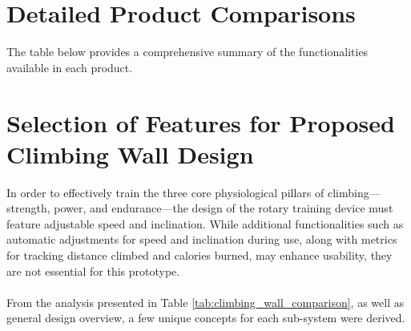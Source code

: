 \section{Detailed Product Comparisons}
The table below provides a comprehensive summary of the functionalities available in each product.

\begin{table}[H]
\centering
\caption{Comparison of Climbing Wall Models}
\label{tab:climbing_wall_comparison}
\end{table}

\section{Selection of Features for Proposed Climbing Wall Design}
In order to effectively train the three core physiological pillars of climbing—strength, power, and endurance—the design of the rotary training device must feature adjustable speed and inclination. While additional functionalities such as automatic adjustments for speed and inclination during use, along with metrics for tracking distance climbed and calories burned, may enhance usability, they are not essential for this prototype.\\\\
From the analysis presented in Table \ref{tab:climbing_wall_comparison}, as well as general design overview, a few unique concepts for each sub-system were derived.



